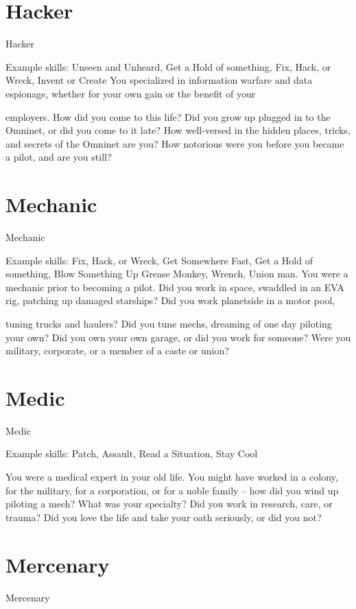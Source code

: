 \section{Hacker}
                                                     Hacker  

Example skills: Unseen and Unheard, Get a Hold of something, Fix, Hack, or Wreck, Invent or  
Create  
You specialized in information warfare and data espionage, whether for your own gain or the benefit of your  

employers. How did you come to this life? Did you grow up plugged in to the Omninet, or did you come to  
it late? How well-versed in the hidden places, tricks, and secrets of the Omninet are you? How notorious  
were you before you became a pilot, and are you still?
 
\section{Mechanic}
                                                   Mechanic  

Example skills: Fix, Hack, or Wreck, Get Somewhere Fast, Get a Hold of something, Blow  
Something Up  
Grease Monkey, Wrench, Union man. You were a mechanic prior to becoming a pilot. Did you work in  
space, swaddled in an EVA rig, patching up damaged starships? Did you work planetside in a motor pool,  

tuning trucks and haulers? Did you tune mechs, dreaming of one day piloting your own? Did you own your  
own garage, or did you work for someone? Were you military, corporate, or a member of a caste or union?    
\section{Medic}
                                                      Medic  

Example skills: Patch, Assault, Read a Situation, Stay Cool  

                                                                                                                  


You were a medical expert in your old life. You might have worked in a colony, for the military, for a  
corporation, or for a noble family -- how did you wind up piloting a mech? What was your specialty? Did  
you work in research, care, or trauma? Did you love the life and take your oath seriously, or did you not?  
\section{Mercenary}
                                                    Mercenary  

